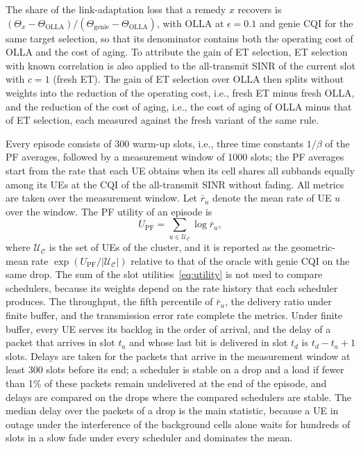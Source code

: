 \documentclass{ieeeaccess}
\begin{document}
The share of the link-adaptation loss that a remedy $x$ recovers is $(\Theta_x - \Theta_{\text{OLLA}})/(\Theta_{\text{genie}} - \Theta_{\text{OLLA}})$, with OLLA at $\epsilon = 0.1$ and genie CQI for the same target selection, so that its denominator contains both the operating cost of OLLA and the cost of aging. To attribute the gain of ET selection, ET selection with known correlation is also applied to the all-transmit SINR of the current slot with $c = 1$ (fresh ET). The gain of ET selection over OLLA then splits without weights into the reduction of the operating cost, i.e., fresh ET minus fresh OLLA, and the reduction of the cost of aging, i.e., the cost of aging of OLLA minus that of ET selection, each measured against the fresh variant of the same rule.

Every episode consists of 300 warm-up slots, i.e., three time constants $1/\beta$ of the PF averages, followed by a measurement window of 1000 slots; the PF averages start from the rate that each UE obtains when its cell shares all subbands equally among its UEs at the CQI of the all-transmit SINR without fading. All metrics are taken over the measurement window. Let $\bar{r}_u$ denote the mean rate of UE $u$ over the window. The PF utility of an episode is
\begin{equation}
U_{\text{PF}} = \sum_{u \in \mathcal{U}_{\mathcal{C}}} \log \bar{r}_u,
\label{eq:pf_utility}
\end{equation}
where $\mathcal{U}_{\mathcal{C}}$ is the set of UEs of the cluster, and it is reported as the geometric-mean rate $\exp(U_{\text{PF}}/|\mathcal{U}_{\mathcal{C}}|)$ relative to that of the oracle with genie CQI on the same drop. The sum of the slot utilities~\eqref{eq:utility} is not used to compare schedulers, because its weights depend on the rate history that each scheduler produces. The throughput, the fifth percentile of $\bar{r}_u$, the delivery ratio under finite buffer, and the transmission error rate complete the metrics. Under finite buffer, every UE serves its backlog in the order of arrival, and the delay of a packet that arrives in slot $t_a$ and whose last bit is delivered in slot $t_d$ is $t_d - t_a + 1$ slots. Delays are taken for the packets that arrive in the measurement window at least 300 slots before its end; a scheduler is stable on a drop and a load if fewer than 1\% of these packets remain undelivered at the end of the episode, and delays are compared on the drops where the compared schedulers are stable. The median delay over the packets of a drop is the main statistic, because a UE in outage under the interference of the background cells alone waits for hundreds of slots in a slow fade under every scheduler and dominates the mean.
\end{document}
